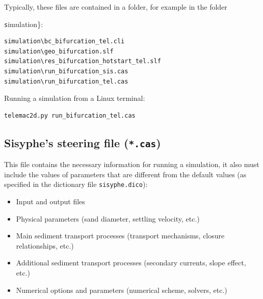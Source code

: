 Typically, these files are contained in a folder, for example in the folder {\texttt simulation\}:
\begin{footnotesize}
\begin{verbatim}
simulation\bc_bifurcation_tel.cli
simulation\geo_bifurcation.slf
simulation\res_bifurcation_hotstart_tel.slf  
simulation\run_bifurcation_sis.cas
simulation\run_bifurcation_tel.cas
\end{verbatim}
\end{footnotesize}

Running a simulation from a Linux terminal:
\begin{footnotesize}
\begin{verbatim}
telemac2d.py run_bifurcation_tel.cas
\end{verbatim}
\end{footnotesize}

\subsection{Sisyphe's steering file (\texttt{*.cas})}
This file contains the necessary information for running a simulation, it also must include the values of parameters that are different from the default values (as specified in the dictionary file \texttt{sisyphe.dico}):
\begin{itemize}
\item Input and output files 
\item Physical parameters (sand diameter, settling velocity, etc.)
\item Main sediment transport processes (transport mechanisms, closure relationships, etc.)
\item Additional sediment transport processes (secondary currents, slope effect, etc.)
\item Numerical options and parameters (numerical scheme, solvers, etc.)
\end{itemize}

\pagebreak

}
